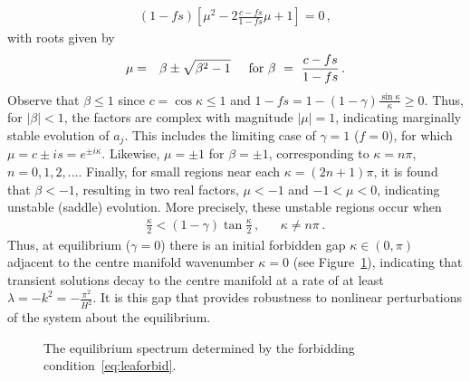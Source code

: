 \documentclass[12pt,a5paper]{article}
\begin{document}
\begin{eqnarray}
(1-fs)\left[\mu^2-2\frac{c-fs}{1-fs}\mu+1\right] = 0\,,
\end{eqnarray}
with roots given by
\begin{eqnarray}
\mu & = & \beta\pm\sqrt{\beta^2-1}
\hspace*{5mm}\mbox{for } 
\beta~=~\frac{c-fs}{1-fs}\,.
\end{eqnarray}
Observe that $\beta\le 1$ since $c=\cos\kappa\le 1$ and 
$1-fs=1-(1-\gamma)\frac{\sin\kappa}{\kappa}\ge 0$.
Thus, for $|\beta|<1$, the factors are complex with magnitude 
$|\mu|=1$,
indicating marginally stable evolution of $a_j$. 
This includes the limiting case of $\gamma=1$ ($f=0$), for which
$\mu=c\pm is=e^{\pm i\kappa}$.
Likewise, $\mu=\pm 1$ for $\beta=\pm 1$, corresponding to $\kappa=n\pi$, $n=0,1,2,\ldots$.
Finally, for small regions near each $\kappa=(2n+1)\pi$, 
it is found that $\beta<-1$, resulting in two real factors,
$\mu<-1$ and $-1<\mu<0$, indicating unstable (saddle) evolution.
More precisely, these unstable regions occur when
\begin{eqnarray}
\frac{\kappa}{2} <(1-\gamma)\tan\frac{\kappa}{2}\,, && \kappa\ne n\pi\,.
\label{eq:leaforbid}
\end{eqnarray}
Thus, at equilibrium ($\gamma=0$) there is an initial forbidden gap $\kappa\in(0,\pi)$ adjacent to the centre manifold
wavenumber $\kappa=0$ (see Figure~\ref{fig:leaspec}), indicating that transient solutions decay to the centre manifold at a rate of at least
$\lambda=-k^2=-\frac{\pi^2}{H^2}$. It is this gap that provides robustness to nonlinear perturbations
of the system about the equilibrium.

\begin{figure}[hbt]
\centering
{}
\caption{The equilibrium spectrum determined by the forbidding condition~\eqref{eq:leaforbid}.}
\label{fig:leaspec}
\end{figure}
\end{document}
